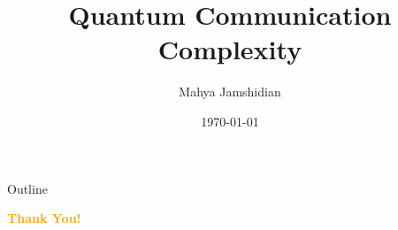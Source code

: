 \documentclass[aspectratio=43, compress]{beamer}
\title{Quantum Communication Complexity}
\author[M. Jamshidian]{Mahya Jamshidian}
\date{\today}
\begin{document}
    
    \frame{\titlepage}
    \begin{frame}{Outline}
        \tableofcontents
    \end{frame}
    
    
    



    \begin{frame}{}
        \centering
            \Huge\bfseries
        \textcolor{orange}{Thank You!}
    \end{frame}
\end{document}
